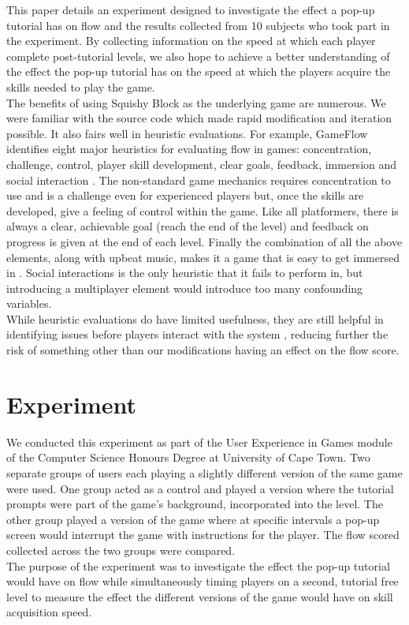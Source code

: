 \documentclass{acmsiggraph}
\begin{document}
This paper details an experiment designed to investigate the effect a pop-up tutorial has on flow and the results collected from 10 subjects who took part in the experiment.  
By collecting information on the speed at which each player complete post-tutorial levels, we also hope to achieve a better understanding of the effect the pop-up tutorial has on the speed at which the players acquire the skills needed to play the game.\\
The benefits of using Squishy Block as the underlying game are numerous. We were familiar with the source code which made rapid modification and iteration possible. It also fairs well in heuristic evaluations. For example, GameFlow identifies eight major heuristics for evaluating flow in games: concentration, challenge, control, player skill development, clear goals, feedback, immersion and social interaction \cite{sweetser}. The non-standard game mechanics requires concentration to use and is a challenge even for experienced players but, once the skills are developed, give a feeling of control within the game. Like all platformers, there is always a clear, achievable goal (reach the end of the level) and feedback on progress is given at the end of each level. Finally the combination of all the above elements, along with upbeat music, makes it a game that is easy to get immersed in \cite{sanders}. Social interactions is the only heuristic that it fails to perform in, but introducing a multiplayer element would introduce too many confounding variables.\\
While heuristic evaluations do have limited usefulness, they are still helpful in identifying issues before players interact with the system \cite{desurvire}, reducing further the risk of something other than our modifications having an effect on the flow score.  

\section{Experiment}

We conducted this experiment as part of the User Experience in Games module of the Computer Science Honours Degree at University of Cape Town. Two separate groups of users each playing a slightly different version of the same game were used. One group acted as a control and played a version where the tutorial prompts were part of the game's background, incorporated into the level. The other group played a version of the game where at specific intervals a pop-up screen would interrupt the game with instructions for the player. The flow scored collected across the two groups were compared.\\
The purpose of the experiment was to investigate the effect the pop-up tutorial would have on flow while simultaneously timing players on a second, tutorial free level to measure the effect the different versions of the game would have on skill acquisition speed.
\end{document}
